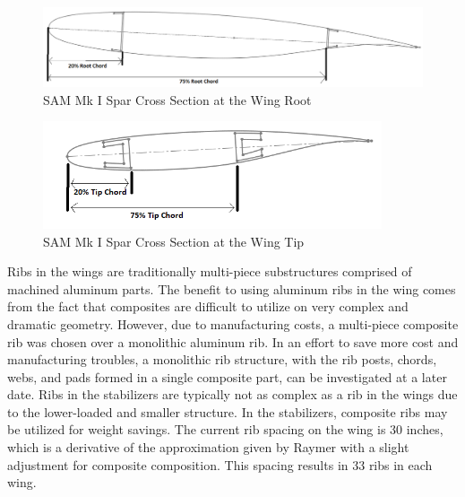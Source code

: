 \begin{figure}[!h]
    \centering
    \includegraphics[width=\linewidth]{Photos/structuresandloads/Spar Layout.PNG}
    \caption{SAM Mk I Spar Cross Section at the Wing Root}
    \label{fig:spar_layout}
\end{figure}
\begin{figure}[!h]
    \centering
    \includegraphics[width=10cm]{Photos/structuresandloads/Spar Layout Tip.PNG}
    \caption{SAM Mk I Spar Cross Section at the Wing Tip}
    \label{fig:spar_layout_tip}
\end{figure}

Ribs in the wings are traditionally multi-piece substructures comprised of machined aluminum parts. The benefit to using aluminum ribs in the wing comes from the fact that composites are difficult to utilize on very complex and dramatic geometry. However, due to manufacturing costs, a multi-piece composite rib was chosen over a monolithic aluminum rib. In an effort to save more cost and manufacturing troubles, a monolithic rib structure, with the rib posts, chords, webs, and pads formed in a single composite part, can be investigated at a later date. Ribs in the stabilizers are typically not as complex as a rib in the wings due to the lower-loaded and smaller structure. In the stabilizers, composite ribs may be utilized for weight savings. The current rib spacing on the wing is 30 inches, which is a derivative of the approximation given by Raymer with a slight adjustment for composite composition. This spacing results in 33 ribs in each wing. 

